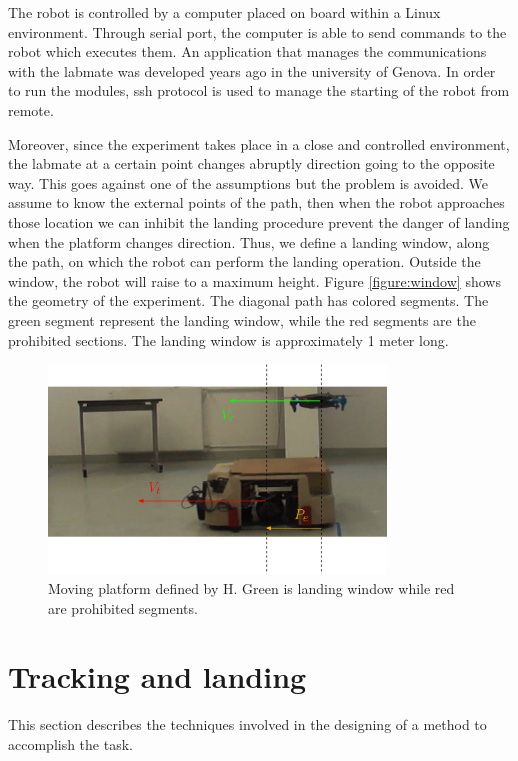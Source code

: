 The robot is controlled by a computer placed on board within a Linux environment. Through serial port, the computer is able to send commands to the robot which executes them. An application that manages the communications with the labmate was developed years ago in the university of Genova. In order to run the modules, ssh protocol is used to manage the starting of the robot from remote. 

Moreover, since the experiment takes place in a close and controlled environment, the labmate at a certain point changes abruptly direction going to the opposite way. This goes against one of the assumptions but the problem is avoided. We assume to know the external points of the path, then when the robot approaches those location we can inhibit the landing procedure prevent the danger of landing when the platform changes direction.  Thus, we define a landing window, along the path, on which the robot can perform the landing operation. Outside the window, the robot will raise to a maximum height. Figure \ref{figure:window} shows the geometry of the experiment. The diagonal path has colored segments. The green segment represent the landing window, while the red segments are the prohibited sections. The landing window is approximately 1 meter long. 
\begin{figure}[h]
 \centering
   \includegraphics[width = 0.8\textwidth ]{landwindow.eps}
    \caption[Experiment geometry]{Moving platform defined by H. Green is landing window while red are prohibited segments.}
   \label{figure:landwindow}
\end{figure}


\section{Tracking and landing}
This section describes the techniques involved in the designing of a method to accomplish the task.

